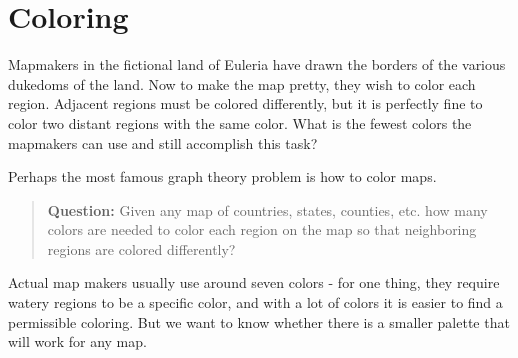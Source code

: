 \documentclass[12pt]{article}
\begin{document}
\section{Coloring}

\begin{activity}
Mapmakers in the fictional land of Euleria have drawn the borders of the various dukedoms of the land.  Now to make the map pretty, they wish to color each region.  Adjacent regions must be colored differently, but it is perfectly fine to color two distant regions with the same color.  What is the fewest colors the mapmakers can use and still accomplish this task?

\begin{center}
\end{center}

\end{activity}

Perhaps the most famous graph theory problem is how to color maps.  

\begin{quote}
  \textbf{Question:} Given any map of countries, states, counties, etc. how many colors are needed to color each region on the map so that neighboring regions are colored differently?
\end{quote}

Actual map makers usually use around seven colors - for one thing, they require watery regions to be a specific color, and with a lot of colors it is easier to find a permissible coloring.  But we want to know whether there is a smaller palette that will work for any map.
\end{document}
